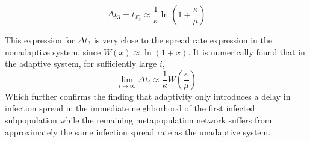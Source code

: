 \begin{equation}\Delta t_3 = t_{F_3} \approx \frac{1}{\kappa} \ln(1+\frac{ \kappa}{\mu})\end{equation}

This expression for $\Delta t_3$ is very close to the spread rate expression in the nonadaptive system, since $W(x) \approx \ln(1+x)$. It is numerically found that in the adaptive system, for sufficiently large $i$, 
\[
\lim_{i \to \infty} \Delta t_i \approx \frac{1}{\kappa} W\left(\frac{\kappa}{\mu}\right)
\]
Which further confirms the finding that adaptivity only introduces a delay in infection spread in the immediate neighborhood of the first infected subpopulation while the remaining metapopulation network suffers from approximately the same infection spread rate as the unadaptive system. 

% 